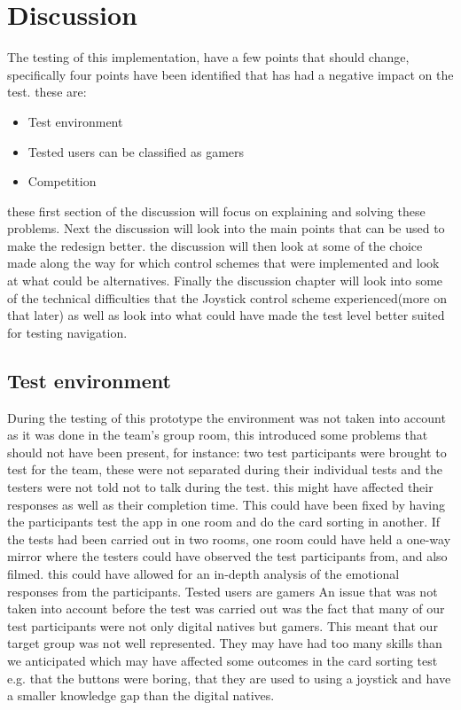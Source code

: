 \chapter{Discussion}
The testing of this implementation, have a few points that should change, specifically four points have been identified that has had a negative impact on the test. these are:
\begin{itemize}
\item Test environment
\item Tested users can be classified as gamers
\item Competition
\end{itemize}
these first section of the discussion will focus on explaining and solving these problems. Next the discussion will look into the main points that can be used to make the redesign better. the discussion will then look at some of the choice made along the way for which control schemes that were implemented and look at what could be alternatives. Finally the discussion chapter will look into some of the technical difficulties that the Joystick control scheme experienced(more on that later) as well as look into what could have made the test level better suited for testing navigation.


\section{Test environment}  
During the testing of this prototype the environment was not taken into account as it was done in the team’s group room, this introduced some problems that should not have been present, for instance: two test participants were brought to test for the team, these were not separated during their individual tests and the testers were not told not to talk during the test. this might have affected their responses as well as their completion time. This could have been fixed by having the participants test the app in one room and do the card sorting in another. If the tests had been carried out in two rooms, one room could have held a one-way mirror where the testers could have observed the test participants from, and also filmed. this could have allowed for an in-depth analysis of the emotional responses from the participants. 
Tested users are gamers
An issue that was not taken into account before the test was carried out was the fact that many of our test participants were not only digital natives but gamers. This meant that our target group was not well represented. They may have had too many skills than we anticipated which may have affected some outcomes in the card sorting test e.g. that the buttons were boring, that they are used to using a joystick and have a smaller knowledge gap than the digital natives.

